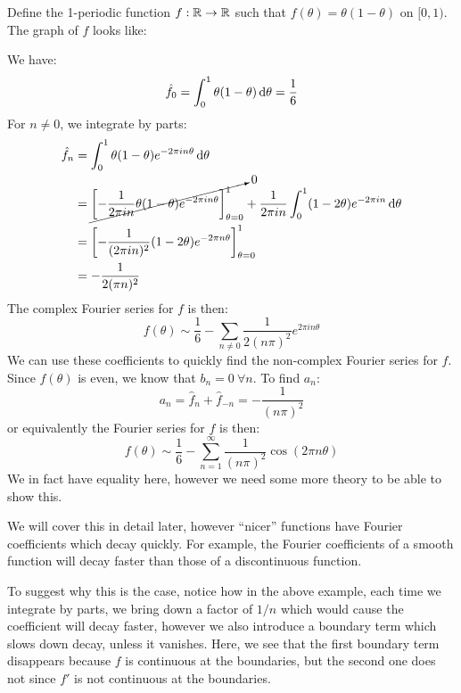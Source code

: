 \documentclass[../main.tex]{subfiles}
\begin{document}
\begin{example}
  Define the 1-periodic function $f: \mathbb{R} \to \mathbb{R}$ such that $f(\theta) = \theta(1 - \theta)$ on $[0, 1)$.
  The graph of $f$ looks like:
  \begin{center}
  \end{center}
  We have:
  \[
    \hat{f}_0 = \int_{0}^{1} \theta(1 - \theta) \d{\theta} = \frac{1}{6}
  \]
  For $n \neq 0$, we integrate by parts:
  \begin{align*}
    \hat{f}_n &= \int_{0}^{1} \theta(1 - \theta)e^{-2 \pi i n \theta} \d{\theta} \\
              &= \cancelto{0}{\eval{-\frac{1}{2 \pi i n} \theta(1 - \theta) e^{-2 \pi i n \theta}}{\theta = 0}{1}} + \frac{1}{2 \pi i n} \int_{0}^{1} (1 - 2 \theta) e^{-2 \pi i n} \d{\theta} \\
              &= \eval{- \frac{1}{(2 \pi i n)^2}(1 - 2 \theta) e^{-2 \pi n \theta}}{\theta = 0}{1} \\
              &= - \frac{1}{2(\pi n)^2}
  \end{align*}
  The complex Fourier series for $f$ is then:
  \[
    f(\theta) \sim \frac{1}{6} - \sum_{n \neq 0} \frac{1}{2 (n \pi)^2} e^{2 \pi i n \theta}
  \]
  We can use these coefficients to quickly find the non-complex Fourier series for $f$.
  Since $f(\theta)$ is even, we know that $b_n = 0\ \forall n$.
  To find $a_n$:
  \[
    a_n = \hat{f}_{n} + \hat{f}_{-n} = - \frac{1}{(n \pi)^2}
  \]
  or equivalently the Fourier series for $f$ is then:
  \[
    f(\theta) \sim \frac{1}{6} - \sum_{n = 1}^{\infty} \frac{1}{(n \pi)^2} \cos(2 \pi n \theta)
  \]
  We in fact have equality here, however we need some more theory to be able to show this.
\end{example}
\begin{remark}
  We will cover this in detail later, however ``nicer'' functions have Fourier coefficients which decay quickly.
  For example, the Fourier coefficients of a smooth function will decay faster than those of a discontinuous function.

  To suggest why this is the case, notice how in the above example, each time we integrate by parts, we bring down a factor of $1/n$ which would cause the coefficient will decay faster, however we also introduce a boundary term which slows down decay, unless it vanishes.
  Here, we see that the first boundary term disappears because $f$ is continuous at the boundaries, but the second one does not since $f'$ is not continuous at the boundaries.
\end{remark}
\end{document}
